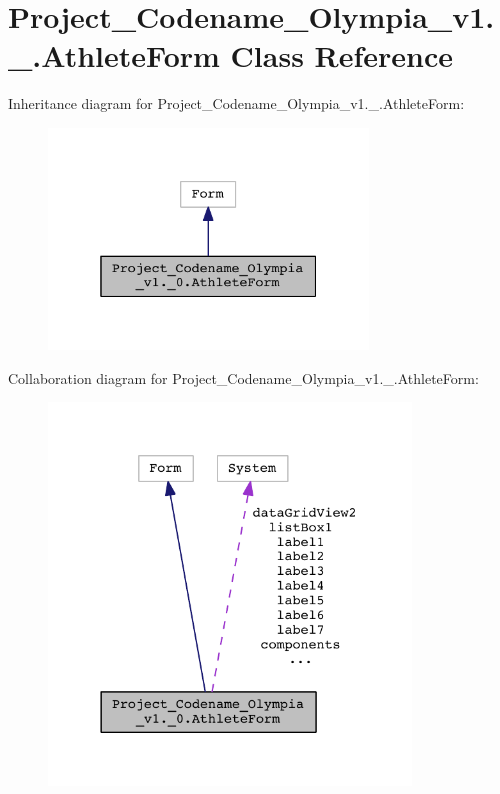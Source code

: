 \hypertarget{classProject__Codename__Olympia__v1_1_1__0_1_1AthleteForm}{}\section{Project\+\_\+\+Codename\+\_\+\+Olympia\+\_\+v1.\+\_.\+Athlete\+Form Class Reference}
\label{classProject__Codename__Olympia__v1_1_1__0_1_1AthleteForm}


Inheritance diagram for Project\+\_\+\+Codename\+\_\+\+Olympia\+\_\+v1.\+\_.\+Athlete\+Form\+:\nopagebreak
\begin{figure}[H]
\begin{center}
\leavevmode
\includegraphics[width=241pt]{classProject__Codename__Olympia__v1_1_1__0_1_1AthleteForm__inherit__graph}
\end{center}
\end{figure}


Collaboration diagram for Project\+\_\+\+Codename\+\_\+\+Olympia\+\_\+v1.\+\_.\+Athlete\+Form\+:\nopagebreak
\begin{figure}[H]
\begin{center}
\leavevmode
\includegraphics[width=273pt]{classProject__Codename__Olympia__v1_1_1__0_1_1AthleteForm__coll__graph}
\end{center}
\end{figure}
